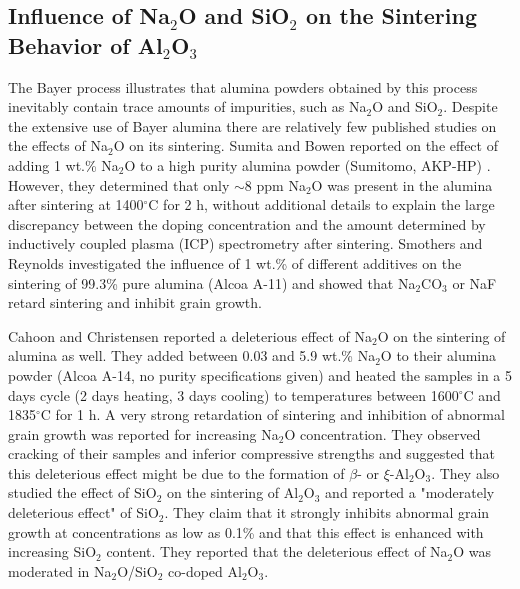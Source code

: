 \subsection{Influence of Na$_{2}$O and SiO$_{2}$ on the Sintering Behavior of Al$_{2}$O$_{3}$}
The Bayer process illustrates that alumina powders obtained by this process inevitably contain trace amounts of impurities, such as Na$_{2}$O and SiO$_{2}$. Despite the extensive use of Bayer alumina there are relatively few published studies on the effects of Na$_{2}$O on its sintering. Sumita and Bowen reported on the effect of adding 1 wt.\% Na$_{2}$O to a high purity alumina powder (Sumitomo, AKP-HP) \cite{Sumita1988}. However, they determined that only $\sim$8 ppm Na$_{2}$O was present in the alumina after sintering at 1400$^{\circ}$C for 2 h, without additional details to explain the large discrepancy between the doping concentration and the amount determined by inductively coupled plasma (ICP) spectrometry after sintering. Smothers and Reynolds \cite{Smothers1954} investigated the influence of 1 wt.\% of different additives on the sintering of 99.3\% pure alumina (Alcoa A-11) and showed that Na$_{2}$CO$_{3}$ or NaF retard sintering and inhibit grain growth. 

Cahoon and Christensen \cite{Cahoon1956} reported a deleterious effect of Na$_{2}$O on the sintering of alumina as well. They added between 0.03 and 5.9 wt.\% Na$_{2}$O to their alumina powder (Alcoa A-14, no purity specifications given) and heated the samples in a 5 days cycle (2 days heating, 3 days cooling) to temperatures between 1600$^{\circ}$C and 1835$^{\circ}$C for 1 h. A very strong retardation of sintering and inhibition of abnormal grain growth was reported for increasing Na$_{2}$O concentration. They observed cracking of their samples and inferior compressive strengths and suggested that this deleterious effect might be due to the formation of $\beta$- or $\xi$-Al$_{2}$O$_{3}$. They also studied the effect of SiO$_{2}$ on the sintering of Al$_{2}$O$_{3}$ and reported a "moderately deleterious effect" of SiO$_{2}$. They claim that it strongly inhibits abnormal grain growth at concentrations as low as 0.1\% and that this effect is enhanced with increasing SiO$_{2}$ content. They reported that the deleterious effect of Na$_{2}$O was moderated in Na$_{2}$O/SiO$_{2}$ co-doped Al$_{2}$O$_{3}$.

